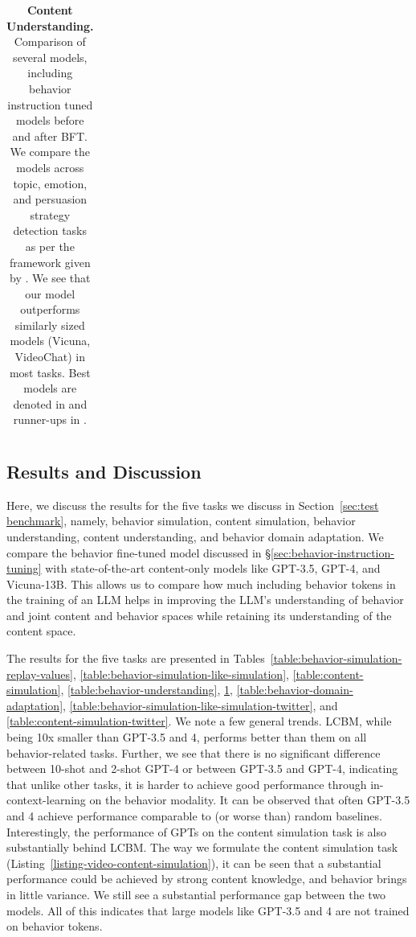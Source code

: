 \begin{table}[!tp]
\begin{minipage}{\linewidth}
\begin{adjustbox}{max width = 1.0\textwidth}
\begin{tabular}{llcccccccc}
\end{tabular}
\end{adjustbox}
\caption{\textbf{Content Understanding.} Comparison of several models, including behavior instruction tuned models before and after BFT. We compare the models across topic, emotion, and persuasion strategy detection tasks as per the framework given by \cite{bhattacharyya-etal-2023-video}. We see that our model outperforms similarly sized models (Vicuna, VideoChat) in most tasks. Best models are denoted in  and runner-ups in .\label{tab:content-understanding}}\end{minipage}
\end{table}



\subsection{Results and Discussion}
\label{sec:results}
Here, we discuss the results for the five tasks we discuss in Section~\ref{sec:test benchmark}, namely, behavior simulation, content simulation, behavior understanding, content understanding, and behavior domain adaptation. We compare the behavior fine-tuned model discussed in \S\ref{sec:behavior-instruction-tuning} with state-of-the-art content-only models like GPT-3.5, GPT-4, and Vicuna-13B. This allows us to compare how much including behavior tokens in the training of an LLM helps in improving the LLM's understanding of behavior and joint content and behavior spaces while retaining its understanding of the content space. 

The results for the five tasks are presented in Tables~\ref{table:behavior-simulation-replay-values}, \ref{table:behavior-simulation-like-simulation}, \ref{table:content-simulation}, \ref{table:behavior-understanding}, \ref{tab:content-understanding}, \ref{table:behavior-domain-adaptation}, \ref{table:behavior-simulation-like-simulation-twitter}, and \ref{table:content-simulation-twitter}. We note a few general trends. LCBM, while being 10x smaller than GPT-3.5 and 4, performs better than them on all behavior-related tasks. Further, we see that there is no significant difference between 10-shot and 2-shot GPT-4 or between GPT-3.5 and GPT-4, indicating that unlike other tasks, it is harder to achieve good performance through in-context-learning on the behavior modality. It can be observed that often GPT-3.5 and 4 achieve performance comparable to (or worse than) random baselines. Interestingly, the performance of GPTs on the content simulation task is also substantially behind LCBM. The way we formulate the content simulation task (Listing~\ref{listing-video-content-simulation}), it can be seen that a substantial performance could be achieved by strong content knowledge, and behavior brings in little variance. We still see a substantial performance gap between the two models. All of this indicates that large models like GPT-3.5 and 4 are not trained on behavior tokens. 


